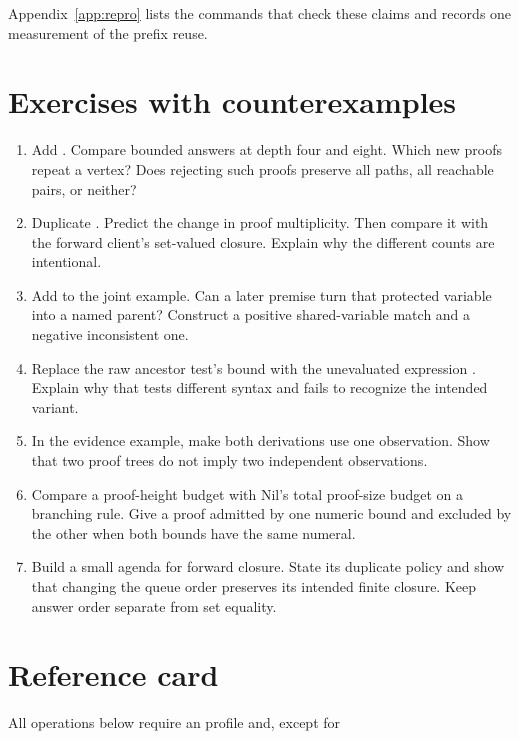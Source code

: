 \documentclass[11pt,a4paper]{article}
\begin{document}
{{{{{{{{{{Appendix~\ref{app:repro} lists the commands that check these claims and
records one measurement of the prefix reuse.

\section{Exercises with counterexamples}
\begin{enumerate}
\item Add . Compare bounded answers at
depth four and eight. Which new proofs repeat a vertex? Does rejecting such
proofs preserve all paths, all reachable pairs, or neither?
\item Duplicate . Predict the change in
proof multiplicity. Then compare it with the forward client's set-valued
closure. Explain why the different counts are intentional.
\item Add  to the joint example. Can a later
premise turn that protected variable into a named parent? Construct a
positive shared-variable match and a negative inconsistent one.
\item Replace the raw ancestor test's bound  with the
unevaluated expression . Explain why that tests
different syntax and fails to recognize the intended variant.
\item In the evidence example, make both derivations use one observation.
Show that two proof trees do not imply two independent observations.
\item Compare a proof-height budget with Nil's total proof-size budget on a
branching rule. Give a proof admitted by one numeric bound and excluded by
the other when both bounds have the same numeral.
\item Build a small agenda for forward closure. State its duplicate policy
and show that changing the queue order preserves its intended finite
closure. Keep answer order separate from set equality.
\end{enumerate}

\appendix
\section{Reference card}\label{app:card}

All operations below require an  profile and, except for
\name{=%

}}}}}}}}}}}
\end{document}
